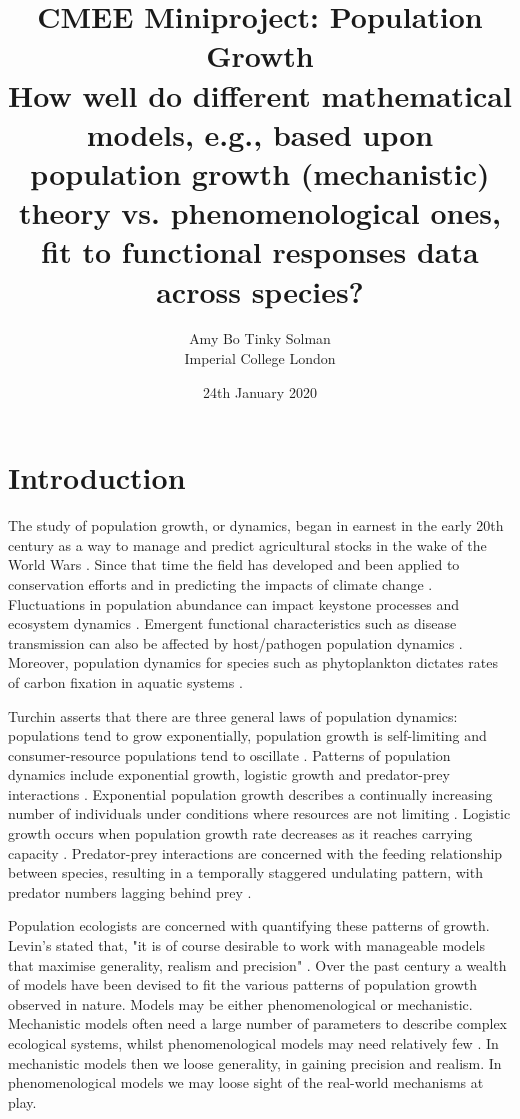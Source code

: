 \documentclass{article}
\title{CMEE Miniproject: Population Growth \\ 
\large How well do different mathematical models, e.g., based upon population growth (mechanistic) theory vs. phenomenological ones, fit to functional responses data across species?}
\author{Amy Bo Tinky Solman\\
Imperial College London}
\date{24th January 2020}
\begin{document}
\maketitle

\section{Introduction}

The study of population growth, or dynamics, began in earnest in the early 20th century as a way to manage and predict agricultural stocks in the wake of the World Wars \cite{KingslandSharonE1995Mn:e}. Since that time the field has developed and been applied to conservation efforts and in predicting the impacts of climate change \cite{ozgul2010coupled} \cite{hunter2010climate}. Fluctuations in population abundance can impact keystone processes and ecosystem dynamics \cite{sinclair2003mammal}. Emergent functional characteristics such as disease transmission can also be affected by host/pathogen population dynamics \cite{alexander1996population}. Moreover, population dynamics for species such as phytoplankton dictates rates of carbon fixation in aquatic systems \cite{reynolds2000regulation}.\ 

\indent Turchin asserts that there are three general laws of population dynamics: populations tend to grow exponentially, population growth is self-limiting and consumer-resource populations tend to oscillate \cite{TurchinPeter2001Dpeh}. Patterns of population dynamics include exponential growth, logistic growth and predator-prey interactions \cite{RockwoodLarryL.2015ItPE}. Exponential population growth describes a continually increasing number of individuals under conditions where resources are not limiting \cite{BotsfordLouisW.author2019Pdfc}. Logistic growth occurs when population growth rate decreases as it reaches carrying capacity \cite{KingslandSharon1982TRMT}. Predator-prey interactions are concerned with the feeding relationship between species, resulting in a temporally staggered undulating pattern, with predator numbers lagging behind prey \cite{BerrymanAlanA.AlanAndrew1937-2008Ps:a}.  \

\indent  Population ecologists are concerned with quantifying these patterns of growth. Levin's stated that, "it is of course desirable to work with manageable models that maximise generality, realism and precision" \cite{levins1966strategy}. Over the past century a wealth of models have been devised to fit the various patterns of population growth observed in nature. Models may be either phenomenological or mechanistic. Mechanistic models often need a large number of parameters to describe complex ecological systems, whilst phenomenological models may need relatively few \cite{transtrum2016bridging}. In mechanistic models then we loose generality, in gaining precision and realism. In phenomenological models we may loose sight of the real-world mechanisms at play.\
\end{document}
